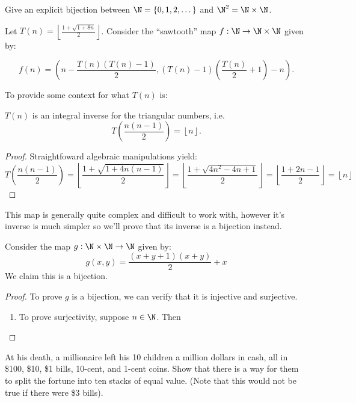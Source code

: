 \documentclass[11pt,letterpaper]{article}
\begin{document}
\pagebreak
\begin{problem}
    Give an explicit bijection between $\N=\{0,1,2,\dots\}$ and
    $\N^2=\N\times\N$.
\end{problem}

Let $T(n)=\left\lfloor \frac{1+\sqrt{1+8n}}{2} \right\rfloor$. Consider the  ``sawtooth'' map $f : \N \to \N \times \N$ given by:

\[ f(n) = \left( n - \frac{T(n)(T(n)-1)}{2}, (T(n)-1)\left(\frac{T(n)}{2}+1\right) - n\right).\]

To provide some context for what $T(n)$ is:

\begin{lemma}
    $T(n)$ is an integral inverse for the triangular numbers, i.e.
    \[T\left(\frac{n(n-1)}{2}\right) = \left\lfloor n \right\rfloor.\]
\end{lemma}

\begin{proof} Straightfoward algebraic manipulations yield:
    \[T\left( \frac{n(n-1)}{2}\right) = \left\lfloor \frac{1+\sqrt{1+4n(n-1)}}{2} \right\rfloor = \left\lfloor \frac{1+\sqrt{4n^2-4n+1}}{2} \right\rfloor = \left\lfloor \frac{1+2n-1}{2} \right\rfloor = \left\lfloor n \right\rfloor\]
\end{proof}

This map is generally quite complex and difficult to work with, however it's inverse is much simpler so we'll prove that its inverse is a bijection instead. 

\begin{lemma}
    Consider the map $g : \N \times \N \to \N$ given by:
    \[ g(x,y) = \frac{(x+y+1)(x+y)}{2} + x\]
    We claim this is a bijection.
\end{lemma}
\begin{proof} To prove $g$ is a bijection, we can verify that it is injective and surjective.
    \begin{enumerate}
        \item To prove surjectivity, suppose $n\in \N$. Then
    \end{enumerate}
\end{proof}

\pagebreak
\begin{problem}
    At his death, a millionaire left his 10 children a million dollars in cash, all in \$100, \$10, \$1 bills, 10-cent, and 1-cent coins. Show that there is a way for them to split the fortune into ten stacks of equal value. (Note that this would not be true if there were \$3 bills).
\end{problem}
\end{document}
